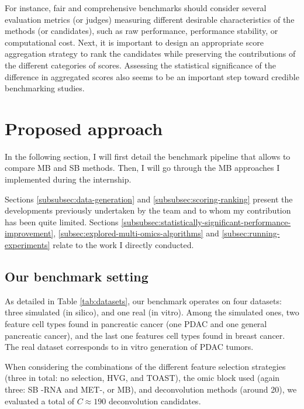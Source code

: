 \documentclass{article}
\begin{document}
For instance, fair and comprehensive benchmarks should consider several evaluation metrics (or judges) measuring different desirable characteristics of the methods (or candidates), such as raw performance, performance stability, or computational cost.
Next, it is important to design an appropriate score aggregation strategy to rank the candidates while preserving the contributions of the different categories of scores.
Assessing the statistical significance of the difference in aggregated scores also seems to be an important step toward credible benchmarking studies.

\section{Proposed approach}\label{sec:proposed-approach}

In the following section, I will first detail the benchmark pipeline that allows to compare MB and SB methods.
Then, I will go through the MB approaches I implemented during the internship.

Sections \ref{subsubsec:data-generation} and \ref{subsubsec:scoring-ranking} present the developments previously undertaken by the team and to whom my contribution has been quite limited.
Sections \ref{subsubsec:statistically-significant-performance-improvement}, \ref{subsec:explored-multi-omics-algorithms} and \ref{subsec:running-experiments} relate to the work I directly conducted.

\subsection{Our benchmark setting}\label{subsec:our-benchmark-setting}

As detailed in Table \ref{tab:datasets}, our benchmark operates on four datasets: three simulated (in silico), and one real (in vitro).
Among the simulated ones, two feature cell types found in pancreatic cancer (one PDAC and one general pancreatic cancer), and the last one features cell types found in breast cancer.
The real dataset corresponds to in vitro generation of PDAC tumors.



When considering the combinations of the different feature selection strategies (three in total: no selection, HVG, and TOAST), the omic block used (again three: SB -RNA and MET-, or MB), and deconvolution methods (around 20), we evaluated a total of $C \approx 190$ deconvolution candidates.
\end{document}
